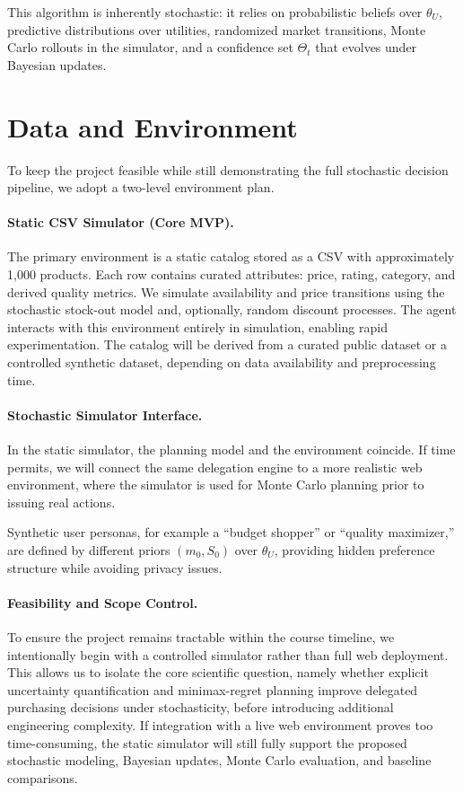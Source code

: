 \documentclass[11pt]{article}
\begin{document}
This algorithm is inherently stochastic: it relies on probabilistic beliefs over $\theta_U$, predictive distributions over utilities, randomized market transitions, Monte Carlo rollouts in the simulator, and a confidence set $\Theta_t$ that evolves under Bayesian updates.

\section{Data and Environment}

To keep the project feasible while still demonstrating the full stochastic decision pipeline, we adopt a two-level environment plan.

\paragraph{Static CSV Simulator (Core MVP).} The primary environment is a static catalog stored as a CSV with approximately 1{,}000 products. Each row contains curated attributes: price, rating, category, and derived quality metrics. We simulate availability and price transitions using the stochastic stock-out model and, optionally, random discount processes. The agent interacts with this environment entirely in simulation, enabling rapid experimentation. The catalog will be derived from a curated public dataset or a controlled synthetic dataset, depending on data availability and preprocessing time.

\paragraph{Stochastic Simulator Interface.} In the static simulator, the planning model and the environment coincide. If time permits, we will connect the same delegation engine to a more realistic web environment, where the simulator is used for Monte Carlo planning prior to issuing real actions.

Synthetic user personas, for example a ``budget shopper'' or ``quality maximizer,'' are defined by different priors $(m_0, S_0)$ over $\theta_U$, providing hidden preference structure while avoiding privacy issues.

\paragraph{Feasibility and Scope Control.} To ensure the project remains tractable within the course timeline, we intentionally begin with a controlled simulator rather than full web deployment. This allows us to isolate the core scientific question, namely whether explicit uncertainty quantification and minimax-regret planning improve delegated purchasing decisions under stochasticity, before introducing additional engineering complexity. If integration with a live web environment proves too time-consuming, the static simulator will still fully support the proposed stochastic modeling, Bayesian updates, Monte Carlo evaluation, and baseline comparisons.
\end{document}
